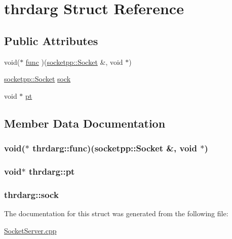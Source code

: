 \hypertarget{structthrdarg}{
\section{thrdarg Struct Reference}
\label{structthrdarg}
}
\subsection*{Public Attributes}
\begin{CompactItemize}
\item 
void($\ast$ \hyperlink{structthrdarg_fa5a1b85854d38a5f34d4563f5a8aae6}{func} )(\hyperlink{classsocketpp_1_1Socket}{socketpp::Socket} \&, void $\ast$)
\item 
\hyperlink{classsocketpp_1_1Socket}{socketpp::Socket} \hyperlink{structthrdarg_a7c26a1d22c901f57babf7f8b7c6b0db}{sock}
\item 
void $\ast$ \hyperlink{structthrdarg_c720f3fca4a6fc972bf6950e01bfaa92}{pt}
\end{CompactItemize}


\subsection{Member Data Documentation}
\hypertarget{structthrdarg_fa5a1b85854d38a5f34d4563f5a8aae6}{
\subsubsection[{func}]{\setlength{\rightskip}{0pt plus 5cm}void($\ast$ {\bf thrdarg::func})({\bf socketpp::Socket} \&, void $\ast$)}}
\label{structthrdarg_fa5a1b85854d38a5f34d4563f5a8aae6}


\hypertarget{structthrdarg_c720f3fca4a6fc972bf6950e01bfaa92}{
\subsubsection[{pt}]{\setlength{\rightskip}{0pt plus 5cm}void$\ast$ {\bf thrdarg::pt}}}
\label{structthrdarg_c720f3fca4a6fc972bf6950e01bfaa92}


\hypertarget{structthrdarg_a7c26a1d22c901f57babf7f8b7c6b0db}{
\subsubsection[{sock}]{ {\bf thrdarg::sock}}}
\label{structthrdarg_a7c26a1d22c901f57babf7f8b7c6b0db}




The documentation for this struct was generated from the following file:\begin{CompactItemize}
\item 
\hyperlink{SocketServer_8cpp}{SocketServer.cpp}\end{CompactItemize}
